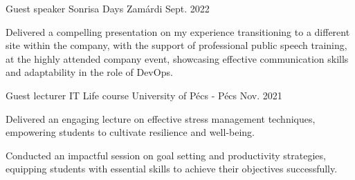 \begin{cventries}
  \cventry
    {Guest speaker} %
    {Sonrisa Days} %
    {Zamárdi} %
    {Sept. 2022} %
    {
      \begin{cvitems} %
        \item {Delivered a compelling presentation on my experience transitioning to a different site within the company, with the support of professional public speech training, at the highly attended company event, showcasing effective communication skills and adaptability in the role of DevOps.}
      \end{cvitems}
    }
  \cventry
    {Guest lecturer} %
    {IT Life course} %
    {University of Pécs - Pécs} %
    {Nov. 2021} %
    {
      \begin{cvitems} %
        \item {Delivered an engaging lecture on effective stress management techniques, empowering students to cultivate resilience and well-being.}
        \item {Conducted an impactful session on goal setting and productivity strategies, equipping students with essential skills to achieve their objectives successfully.}
      \end{cvitems}
    }
\end{cventries}
